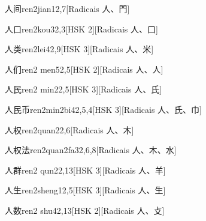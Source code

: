 \begin{entry}{人间}{ren2jian1}{2,7}[Radicais ⼈、⾨]
\end{entry}

\begin{entry}{人口}{ren2kou3}{2,3}[HSK 2][Radicais ⼈、⼝]
\end{entry}

\begin{entry}{人类}{ren2lei4}{2,9}[HSK 3][Radicais ⼈、⽶]
\end{entry}

\begin{entry}{人们}{ren2 men5}{2,5}[HSK 2][Radicais ⼈、⼈]
\end{entry}

\begin{entry}{人民}{ren2 min2}{2,5}[HSK 3][Radicais ⼈、⽒]
\end{entry}

\begin{entry}{人民币}{ren2min2bi4}{2,5,4}[HSK 3][Radicais ⼈、⽒、⼱]
\end{entry}

\begin{entry}{人权}{ren2quan2}{2,6}[Radicais ⼈、⽊]
\end{entry}

\begin{entry}{人权法}{ren2quan2fa3}{2,6,8}[Radicais ⼈、⽊、⽔]
\end{entry}

\begin{entry}{人群}{ren2 qun2}{2,13}[HSK 3][Radicais ⼈、⽺]
\end{entry}

\begin{entry}{人生}{ren2sheng1}{2,5}[HSK 3][Radicais ⼈、⽣]
\end{entry}

\begin{entry}{人数}{ren2 shu4}{2,13}[HSK 2][Radicais ⼈、⽁]
\end{entry}

